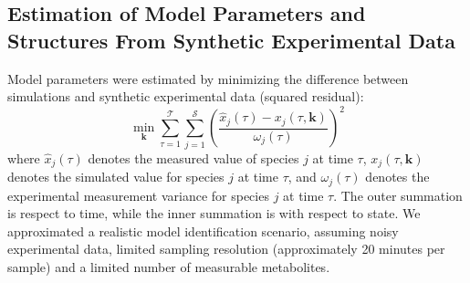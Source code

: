 \documentclass[processes,article,accept,moreauthors,pdftex,12pt,a4paper]{mdpi}
\begin{document}
\subsection{Estimation of Model Parameters and Structures From Synthetic Experimental Data}

Model parameters were estimated by minimizing the difference between simulations and synthetic experimental data (squared residual):
\begin{equation}\label{eqn:objective-function}
	\min_{\mathbf{k}} \sum_{\tau=1}^{\mathcal{T}}\sum_{j=1}^{\mathcal{S}}\left(\frac{\hat{x}_{j}\left(\tau\right) - x_{j}\left(\tau,\mathbf{k}\right)}{\omega_{j}\left(\tau\right)}\right)^{2}
\end{equation}where $\hat{x}_{j}\left(\tau\right)$ denotes the measured value of species $j$ at time $\tau$, $x_{j}\left(\tau,\mathbf{k}\right)$ denotes the simulated 
value for species $j$ at time $\tau$, and $\omega_{j}\left(\tau\right)$ denotes the experimental measurement variance for species $j$ at time $\tau$. The outer summation is respect to
time, while the inner summation is with respect to state. We approximated a realistic model identification scenario, assuming noisy experimental data, 
limited sampling resolution (approximately 20 minutes per sample) and a limited number of measurable metabolites. 
\end{document}
